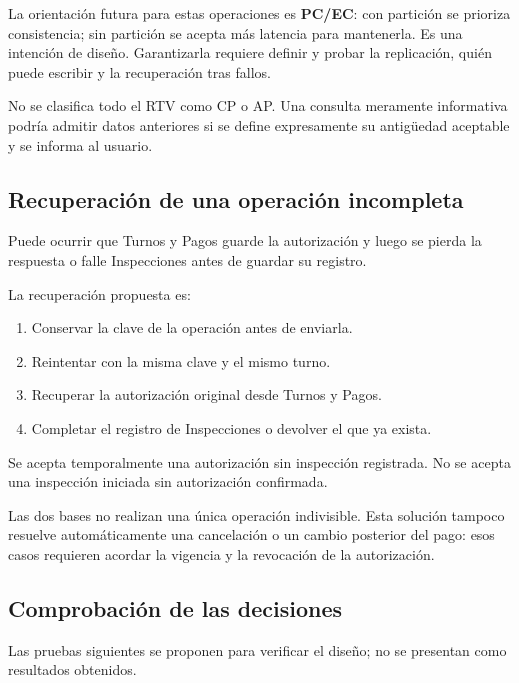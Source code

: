 \documentclass[11pt,a4paper]{article}
\begin{document}
	La orientación futura para estas operaciones es \textbf{PC/EC}: con partición se prioriza consistencia; sin partición se acepta más latencia para mantenerla. Es una intención de diseño. Garantizarla requiere definir y probar la replicación, quién puede escribir y la recuperación tras fallos.
	
	No se clasifica todo el RTV como CP o AP. Una consulta meramente informativa podría admitir datos anteriores si se define expresamente su antigüedad aceptable y se informa al usuario.
	
	\subsection{Recuperación de una operación incompleta}
	
	Puede ocurrir que Turnos y Pagos guarde la autorización y luego se pierda la respuesta o falle Inspecciones antes de guardar su registro.
	
	La recuperación propuesta es:
	
	\begin{enumerate}[nosep]
		\item Conservar la clave de la operación antes de enviarla.
		\item Reintentar con la misma clave y el mismo turno.
		\item Recuperar la autorización original desde Turnos y Pagos.
		\item Completar el registro de Inspecciones o devolver el que ya exista.
	\end{enumerate}
	
	Se acepta temporalmente una autorización sin inspección registrada. No se acepta una inspección iniciada sin autorización confirmada.
	
	Las dos bases no realizan una única operación indivisible. Esta solución tampoco resuelve automáticamente una cancelación o un cambio posterior del pago: esos casos requieren acordar la vigencia y la revocación de la autorización.
	
	\subsection{Comprobación de las decisiones}
	
	Las pruebas siguientes se proponen para verificar el diseño; no se presentan como resultados obtenidos.
	
\end{document}
